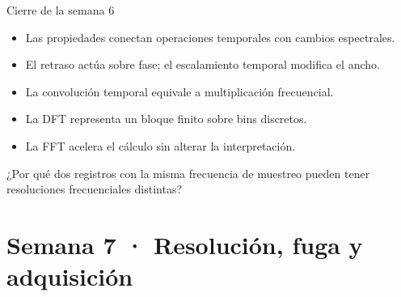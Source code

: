 \documentclass[
  ignorenonframetext,
  aspectratio=169,
  spanish,
]{beamer}
\providecommand{\tightlist}{%
  \setlength{\itemsep}{0pt}\setlength{\parskip}{0pt}}
\begin{document}
\begin{frame}{Cierre de la semana 6}
  \protect{}\label{cierre-de-la-semana-6}
  \begin{itemize}
    \tightlist
    \item
          Las propiedades conectan operaciones temporales con cambios
          espectrales.
    \item
          El retraso actúa sobre fase; el escalamiento temporal modifica el
          ancho.
    \item
          La convolución temporal equivale a multiplicación frecuencial.
    \item
          La DFT representa un bloque finito sobre bins discretos.
    \item
          La FFT acelera el cálculo sin alterar la interpretación.
  \end{itemize}

  \begin{tcolorbox}[enhanced jigsaw, arc=.35mm, bottomrule=.15mm, bottomtitle=1mm, breakable, colback=white, colbacktitle=quarto-callout-note-color!10!white, colframe=quarto-callout-note-color-frame, coltitle=black, left=2mm, leftrule=.75mm, opacityback=0, opacitybacktitle=0.6, rightrule=.15mm, title=\textcolor{quarto-callout-note-color}{\faInfo}\hspace{0.5em}{Pregunta de salida}, titlerule=0mm, toprule=.15mm, toptitle=1mm]

    ¿Por qué dos registros con la misma frecuencia de muestreo pueden tener
    resoluciones frecuenciales distintas?

  \end{tcolorbox}
\end{frame}

\section{Semana 7 · Resolución, fuga y
  adquisición}\label{semana-7-resoluciuxf3n-fuga-y-adquisiciuxf3n}
\end{document}
